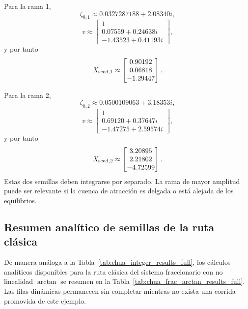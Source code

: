 \documentclass[journal]{IEEEtran}
\begin{document}
Para la rama 1,
\begin{equation}
\label{eq:zeta_wu_1}
\zeta_{0,1}\approx0.0327287188+2.08340i,
\end{equation}
\begin{equation}
\label{eq:v_wu_1}
v\approx
\begin{bmatrix}
1\\
0.07559+0.24638i\\
-1.43523+0.41193i
\end{bmatrix},
\end{equation}
y por tanto
\begin{equation}
\label{eq:seed_arctan_1}
X_{{\rm seed},1}\approx
\begin{bmatrix}
0.90192\\
0.06818\\
-1.29447
\end{bmatrix}.
\end{equation}

Para la rama 2,
\begin{equation}
\label{eq:zeta_wu_2}
\zeta_{0,2}\approx0.0500109063+3.18353i,
\end{equation}
\begin{equation}
\label{eq:v_wu_2}
v\approx
\begin{bmatrix}
1\\
0.69120+0.37647i\\
-1.47275+2.59574i
\end{bmatrix},
\end{equation}
y por tanto
\begin{equation}
\label{eq:seed_arctan_2}
X_{{\rm seed},2}\approx
\begin{bmatrix}
3.20895\\
2.21802\\
-4.72599
\end{bmatrix}.
\end{equation}
Estas dos semillas deben integrarse por separado. La rama de mayor amplitud puede ser relevante si la cuenca de atracción es delgada o está alejada de los equilibrios.

\subsection{Resumen analítico de semillas de la ruta clásica}

De manera análoga a la Tabla~\ref{tab:chua_integer_results_full}, los
cálculos analíticos disponibles para la ruta clásica del sistema fraccionario
con no linealidad \(\arctan\) se resumen en la
Tabla~\ref{tab:chua_frac_arctan_results_full}. Las filas dinámicas permanecen
sin completar mientras no exista una corrida promovida de este ejemplo.
\end{document}
